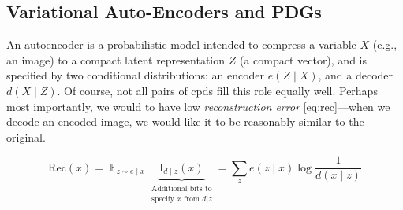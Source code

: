 \documentclass{article}
\makeatletter
\theoremstyle{plain}
\theoremstyle{definition}
\let\H\relax
\DeclareMathOperator{\H}{\mathrm{H}} %
\DeclareMathOperator*{\Ex}{\mathbb{E}} %
\newcommand{\datadist}[1]{\Pr\nolimits_{#1}}
\newcommand\Inc{\mathit{Inc}}
\newcommand\aar{\@ifstar\aar@one@star\aar@plain}
\newcommand\aar@one@star{\@ifstar\aar@resize{\aar@plain*}}
\newcommand\aar@resize[1]{\sbox{\aar@content}{#1}\scaleleftright[3.8ex]
		{\Biggl\langle\!\!\!\!\Biggl\langle}{\usebox{\aar@content}}
		{\Biggr\rangle\!\!\!\!\Biggr\rangle}}
\makeatother
\begin{document}


\subsection{Variational Auto-Encoders and PDGs}

An autoencoder is a probabilistic model intended to compress a variable $X$ (e.g., an image) to a compact latent representation $Z$ (a compact vector), and is specified by two conditional distributions:
an encoder $e(Z \mid X)$, and a decoder $d(X \mid Z)$.
Of course, not all pairs of cpds fill this role equally well.
Perhaps most importantly, we would to have low \emph{reconstruction error} \eqref{eq:rec}---when we decode an encoded image, we would like it to be reasonably similar to the original.

\begin{equation}
 \mathrm{Rec}(x) = \Ex_{z \sim e \mid x} \underbrace{~\mathrm I_{d\mid z}(x)~}_{\substack{\text{Additional bits to}\\\text{specify $x$ from $d|z$}}}
	= \sum_z e(z \mid x) \log \frac1{d(x \mid z)}\label{eq:rec}
\end{equation}
\end{document}
